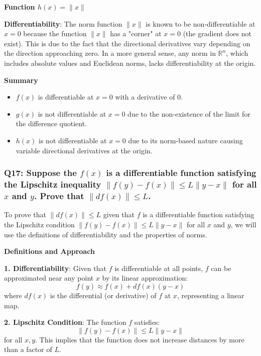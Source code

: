 \documentclass[8pt]{article}
\begin{document}
\textbf{Function \( h(x) = \| x \| \)}

\textbf{Differentiability}:
The norm function \( \| x \| \) is known to be non-differentiable at \( x = 0 \) because the function \( \| x \| \) has a "corner" at \( x = 0 \) (the gradient does not exist). This is due to the fact that the directional derivatives vary depending on the direction approaching zero. In a more general sense, any norm in \( \mathbb{R}^n \), which includes absolute values and Euclidean norms, lacks differentiability at the origin.

\textbf{Summary}

\begin{itemize}
    \item \textbf{\( f(x) \)} is differentiable at \( x = 0 \) with a derivative of 0.
    \item \textbf{\( g(x) \)} is not differentiable at \( x = 0 \) due to the non-existence of the limit for the difference quotient.
    \item \textbf{\( h(x) \)} is not differentiable at \( x = 0 \) due to its norm-based nature causing variable directional derivatives at the origin.
\end{itemize}

\subsubsection*{Q17: Suppose the \( f(x) \) is a differentiable function satisfying the Lipschitz inequality \( \| f(y) - f(x) \| \leq L \| y - x \| \) for all \( x \) and \( y \). Prove that \( \| df(x) \| \leq L \).}

To prove that \( \| df(x) \| \leq L \) given that \( f \) is a differentiable function satisfying the Lipschitz condition \( \| f(y) - f(x) \| \leq L \| y - x \| \) for all \( x \) and \( y \), we will use the definitions of differentiability and the properties of norms.

\textbf{Definitions and Approach}

\textbf{1. Differentiability}: Given that \( f \) is differentiable at all points, \( f \) can be approximated near any point \( x \) by its linear approximation:
   \[
   f(y) \approx f(x) + df(x)(y - x)
   \]
   where \( df(x) \) is the differential (or derivative) of \( f \) at \( x \), representing a linear map.

\textbf{2. Lipschitz Condition}: The function \( f \) satisfies:
   \[
   \| f(y) - f(x) \| \leq L \| y - x \|
   \]
   for all \( x, y \). This implies that the function does not increase distances by more than a factor of \( L \).
\end{document}
